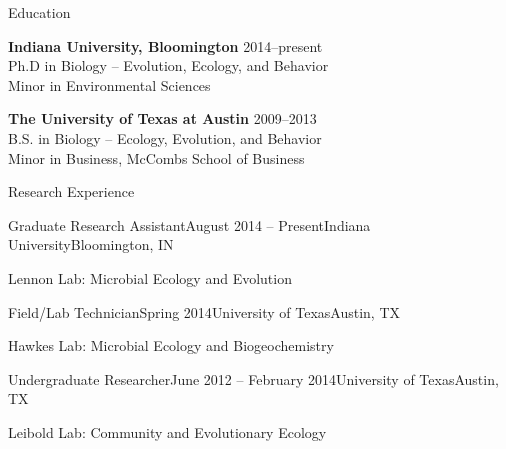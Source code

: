 \documentclass{resume} %
\begin{document}

\begin{rSection}{Education}

{\bf Indiana University, Bloomington} \hfill {2014--present} \\
Ph.D in Biology -- Evolution, Ecology, and Behavior \\
Minor in Environmental Sciences

{\bf The University of Texas at Austin} \hfill {2009--2013} \\
B.S. in Biology -- Ecology, Evolution, and Behavior \\
Minor in Business, McCombs School of Business \smallskip \\

\end{rSection}


\begin{rSection}{Research Experience}


\begin{rSubsection}{Graduate Research Assistant}{August 2014 -- Present}{Indiana University}{Bloomington, IN}
\item Lennon Lab: Microbial Ecology and Evolution
\end{rSubsection}

\begin{rSubsection}{Field/Lab Technician}{Spring 2014}{University of Texas}{Austin, TX}
\item Hawkes Lab: Microbial Ecology and Biogeochemistry
\end{rSubsection}

\begin{rSubsection}{Undergraduate Researcher}{June 2012 -- February 2014}{University of Texas}{Austin, TX}
\item Leibold Lab: Community and Evolutionary Ecology
\end{rSubsection}

\end{rSection}

\end{document}
